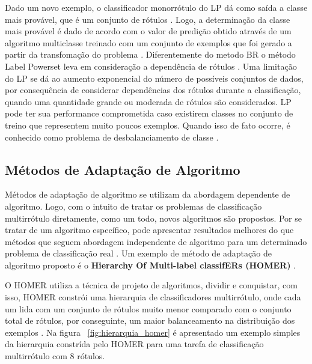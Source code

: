 Dado um novo exemplo, o classificador monorrótulo do LP dá como saída a classe mais provável, que é um conjunto de rótulos \cite{modi2012experimental}. Logo, a determinação da classe mais provável é dado de acordo com o valor de predição obtido através de um algoritmo multiclasse treinado com um conjunto de exemplos que foi gerado a partir da transfomação do problema \cite{chermanaprendizado}. Diferentemente do metodo BR o método Label Powerset leva em consideração a dependência de rótulos \cite{modi2012experimental}. Uma limitação do LP se dá ao aumento exponencial do número de possíveis conjuntos de dados, por consequência de considerar dependências dos rótulos durante a classificação, quando uma quantidade grande ou moderada de rótulos são considerados. LP pode ter sua performance comprometida caso existirem classes no conjunto de treino que representem muito poucos exemplos. Quando isso de fato ocorre, é conhecido como problema de desbalanciamento de classe \cite{cherman2011multi}.

\subsection{Métodos de Adaptação de Algoritmo}

Métodos de adaptação de algoritmo se utilizam da abordagem dependente de algoritmo. Logo, com o intuito de tratar os problemas de classificação multirrótulo diretamente, como um todo, novos algoritmos são propostos. Por se tratar de um algoritmo específico, pode apresentar resultados melhores do que métodos que seguem abordagem independente de algoritmo para um determinado problema de classificação real \cite{faceli2011inteligencia}. Um exemplo de método de adaptação de algoritmo proposto é o \textbf{Hierarchy Of Multi-label classifERs (HOMER)} \cite{tsoumakas2008effective}.

O HOMER utiliza a técnica de projeto de algoritmos, dividir e conquistar, com isso, HOMER constrói uma  hierarquia de classificadores multirrótulo, onde cada um lida com um conjunto de rótulos muito menor comparado com o conjunto total de rótulos, por conseguinte, um maior balanceamento na distribuição dos exemplos \cite{tsoumakas2008effective}. Na figura ~\ref{fig:hierarquia_homer} é apresentado um exemplo simples da hierarquia constrída pelo HOMER para uma tarefa de classificação multirrótulo com 8 rótulos. 

